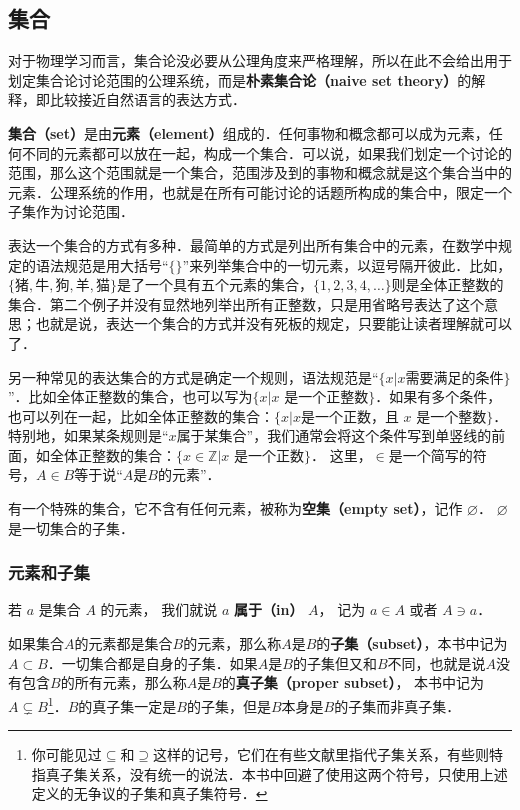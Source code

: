
\subsection{集合}

对于物理学习而言，集合论没必要从公理角度来严格理解，所以在此不会给出用于划定集合论讨论范围的公理系统，而是\textbf{朴素集合论（naive set theory）}的解释，即比较接近自然语言的表达方式．

\textbf{集合（set）}是由\textbf{元素（element）}组成的．任何事物和概念都可以成为元素，任何不同的元素都可以放在一起，构成一个集合．可以说，如果我们划定一个讨论的范围，那么这个范围就是一个集合，范围涉及到的事物和概念就是这个集合当中的元素．公理系统的作用，也就是在所有可能讨论的话题所构成的集合中，限定一个子集作为讨论范围．

表达一个集合的方式有多种．最简单的方式是列出所有集合中的元素，在数学中规定的语法规范是用大括号“$\{\}$”来列举集合中的一切元素，以逗号隔开彼此．比如，$\{\text{猪}, \text{牛}, \text{狗}, \text{羊}, \text{猫}\}$是了一个具有五个元素的集合，$\{1,2,3,4,\dots\}$则是全体正整数的集合．第二个例子并没有显然地列举出所有正整数，只是用省略号表达了这个意思；也就是说，表达一个集合的方式并没有死板的规定，只要能让读者理解就可以了．

另一种常见的表达集合的方式是确定一个规则，语法规范是“$\{x|x \text{需要满足的条件}\}$”．比如全体正整数的集合，也可以写为$\{x|\text{$x$ 是一个正整数}\}$．如果有多个条件，也可以列在一起，比如全体正整数的集合：$\{x|x \text{是一个正数，且 $x$ 是一个整数}\}$．特别地，如果某条规则是“$x$属于某集合”，我们通常会将这个条件写到单竖线的前面，如全体正整数的集合：$\{x\in\mathbb{Z}|\text{$x$ 是一个正数}\}$． 这里，$\in$是一个简写的符号，$A\in B$等于说“$A$是$B$的元素”．

有一个特殊的集合，它不含有任何元素，被称为\textbf{空集（empty set）}，记作 $\varnothing$． $\varnothing$是一切集合的子集．

\subsubsection{元素和子集}
若 $a$ 是集合 $A$ 的元素， 我们就说 $a$ \textbf{属于（in）} $A$， 记为 $a \in A$ 或者 $A \ni a$．

如果集合$A$的元素都是集合$B$的元素，那么称$A$是$B$的\textbf{子集（subset）}，本书中记为$A\subset B$．一切集合都是自身的子集．如果$A$是$B$的子集但又和$B$不同，也就是说$A$没有包含$B$的所有元素，那么称$A$是$B$的\textbf{真子集（proper subset）}， 本书中记为 $A \subsetneq B$\footnote{你可能见过$\subseteq$和$\supseteq$这样的记号，它们在有些文献里指代子集关系，有些则特指真子集关系，没有统一的说法．本书中回避了使用这两个符号，只使用上述定义的无争议的子集和真子集符号．}．$B$的真子集一定是$B$的子集，但是$B$本身是$B$的子集而非真子集．

